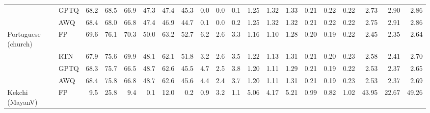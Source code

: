 \begin{landscape}
\begin{longtable}{llrrrrrrrrrrrrrrrrrr}
 & GPTQ & \cellcolor{loss!8}68.2 & \cellcolor{loss!2}68.5 & \cellcolor{loss!3}66.9 & \cellcolor{loss!7}47.3 & \cellcolor{loss!2}47.4 & \cellcolor{loss!2}45.3 & 0.0 & 0.0 & \cellcolor{loss!2}0.1 & \cellcolor{loss!0}1.25 & \cellcolor{loss!1}1.32 & \cellcolor{loss!0}1.33 & \cellcolor{loss!0}0.21 & \cellcolor{loss!0}0.22 & \cellcolor{loss!0}0.22 & \cellcolor{loss!0}2.73 & \cellcolor{loss!0}2.90 & \cellcolor{loss!0}2.86 \\
 & AWQ & \cellcolor{loss!6}68.4 & \cellcolor{loss!8}68.0 & \cellcolor{loss!6}66.8 & \cellcolor{loss!6}47.4 & \cellcolor{loss!6}46.9 & \cellcolor{loss!6}44.7 & 0.1 & 0.0 & \cellcolor{loss!5}0.2 & \cellcolor{loss!1}1.25 & \cellcolor{loss!1}1.32 & \cellcolor{loss!0}1.32 & \cellcolor{loss!0}0.21 & \cellcolor{loss!0}0.22 & \cellcolor{loss!0}0.22 & \cellcolor{loss!0}2.75 & \cellcolor{loss!0}2.91 & \cellcolor{loss!0}2.86 \\
\midrule
Portuguese (church) & FP & 69.6 & 76.1 & 70.3 & 50.0 & 63.2 & 52.7 & 6.2 & 2.6 & 3.3 & 1.16 & 1.10 & 1.28 & 0.20 & 0.19 & 0.22 & 2.45 & 2.35 & 2.64 \\
 & RTN & \cellcolor{loss!23}67.9 & \cellcolor{loss!7}75.6 & \cellcolor{loss!6}69.9 & \cellcolor{loss!13}48.1 & \cellcolor{loss!8}62.1 & \cellcolor{loss!7}51.8 & 3.2 & 2.6 & \cellcolor{loss!4}3.5 & \cellcolor{loss!4}1.22 & \cellcolor{loss!2}1.13 & \cellcolor{loss!2}1.31 & \cellcolor{loss!4}0.21 & \cellcolor{loss!4}0.20 & \cellcolor{loss!4}0.23 & \cellcolor{loss!1}2.58 & \cellcolor{loss!0}2.41 & \cellcolor{loss!0}2.70 \\
 & GPTQ & \cellcolor{loss!17}68.3 & \cellcolor{loss!5}75.7 & \cellcolor{loss!50}66.5 & \cellcolor{loss!9}48.7 & \cellcolor{loss!5}62.6 & \cellcolor{loss!51}45.5 & 4.7 & 2.5 & \cellcolor{loss!10}3.8 & \cellcolor{loss!3}1.20 & \cellcolor{loss!1}1.11 & \cellcolor{loss!1}1.29 & \cellcolor{loss!3}0.21 & \cellcolor{loss!1}0.19 & \cellcolor{loss!0}0.22 & \cellcolor{loss!1}2.53 & \cellcolor{loss!0}2.37 & \cellcolor{loss!0}2.65 \\
 & AWQ & \cellcolor{loss!17}68.4 & \cellcolor{loss!4}75.8 & \cellcolor{loss!47}66.8 & \cellcolor{loss!10}48.7 & \cellcolor{loss!4}62.6 & \cellcolor{loss!51}45.6 & 4.4 & 2.4 & \cellcolor{loss!8}3.7 & \cellcolor{loss!3}1.20 & \cellcolor{loss!1}1.11 & \cellcolor{loss!2}1.31 & \cellcolor{loss!4}0.21 & 0.19 & \cellcolor{loss!3}0.23 & \cellcolor{loss!1}2.53 & \cellcolor{loss!0}2.37 & \cellcolor{loss!0}2.69 \\
\midrule
Kekchi (MayanV) & FP & 9.5 & 25.8 & 9.4 & 0.1 & 12.0 & 0.2 & 0.9 & 3.2 & 1.1 & 5.06 & 4.17 & 5.21 & 0.99 & 0.82 & 1.02 & 43.95 & 22.67 & 49.26 \\

\end{longtable}
\end{landscape}
